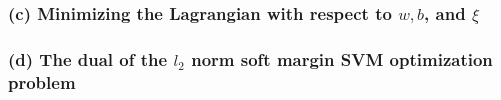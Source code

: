 \subsubsection*{(c) Minimizing the Lagrangian with respect to \( w, b \), and \( \xi \)}

\subsubsection*{(d) The dual of the \( l_{2} \) norm soft margin SVM optimization problem}
